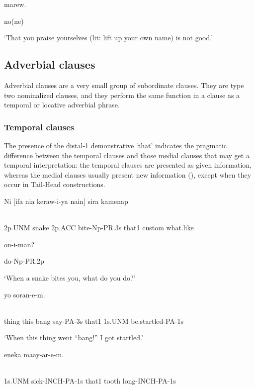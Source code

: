 marew.

no(ne)

`That you praise yourselves (lit: lift up your own name) is not good.'

\subsection{Adverbial clauses}
\hypertarget{RefHeading23621935131865}{}
Adverbial clauses are a very small group of subordinate clauses. They are type two nominalized clauses, and they perform the same function in a clause as a temporal or locative adverbial phrase. 

\subsubsection[Temporal clauses ]{Temporal clauses} 
\hypertarget{RefHeading23641935131865}{}
The presence of the distal-1 demonstrative  `that' indicates the pragmatic difference between the temporal clauses and those medial clauses that may get a temporal interpretation: the temporal clauses are presented as given information, whereas the medial clauses usually present new information (), except when they occur in Tail-Head constructions.

\ea%
\label{ex:x1540}
\gll Ni  [ifa  nia  keraw-i-ya  nain]  sira  kamenap \\
      \\
\glt
\z

2p.UNM  snake  2p.ACC  bite-Np-PR.3s  that1  custom  what.like

on-i-man?

do-Np-PR.2p

`When a snake bites you, what do you do?'

\ea%
\label{ex:x1569}
  yo  soran-e-m. \\
      \\
\glt
\z

thing  this  bang  say-PA-3s  that1  1s.UNM  be.startled-PA-1s

`When this thing went ``bang!'' I got startled.'

\ea%
\label{ex:x1624}
  eneka  maay-ar-e-m. \\
      \\
\glt
\z

1s.UNM  sick-INCH-PA-1s  that1  tooth  long-INCH-PA-1s

